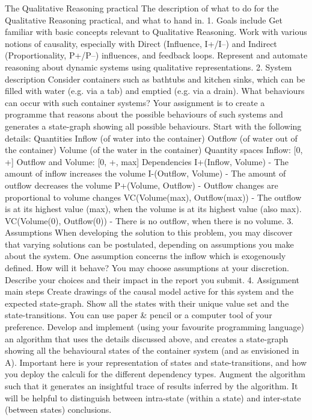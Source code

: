 The Qualitative Reasoning practical
The description of what to do for the Qualitative Reasoning practical, and what to hand in.
1. Goals include
Get familiar with basic concepts relevant to Qualitative Reasoning.
Work with various notions of causality, especially with Direct (Influence, I+/I–) and Indirect (Proportionality, P+/P–) influences, and feedback loops.
Represent and automate reasoning about dynamic systems using qualitative representations.
2. System description
Consider containers such as bathtubs and kitchen sinks, which can be filled with water (e.g. via a tab) and emptied (e.g. via a drain). What behaviours can occur with such container systems? Your assignment is to create a programme that reasons about the possible behaviours of such systems and generates a state-graph showing all possible behaviours.
Start with the following details:
Quantities
Inflow (of water into the container)
Outflow (of water out of the container)
Volume (of the water in the container)
Quantity spaces
Inflow: [0, +]
Outflow and Volume: [0, +, max]
Dependencies
I+(Inflow, Volume) - The amount of inflow increases the volume
I-(Outflow, Volume) - The amount of outflow decreases the volume
P+(Volume, Outflow) - Outflow changes are proportional to volume changes
VC(Volume(max), Outflow(max)) - The outflow is at its highest value (max), when the volume is at its highest value (also max).
VC(Volume(0), Outflow(0)) - There is no outflow, when there is no volume.
3. Assumptions
When developing the solution to this problem, you may discover that varying solutions can be postulated, depending on assumptions you make about the system. One assumption concerns the inflow which is exogenously defined. How will it behave? You may choose assumptions at your discretion. Describe your choices and their impact in the report you submit.
4. Assignment main steps
Create drawings of the causal model active for this system and the expected state-graph. Show all the states with their unique value set and the state-transitions. You can use paper & pencil or a computer tool of your preference.
Develop and implement (using your favourite programming language) an algorithm that uses the details discussed above, and creates a state-graph showing all the behavioural states of the container system (and as envisioned in A). Important here is your representation of states and state-transitions, and how you deploy the calculi for the different dependency types.
Augment the algorithm such that it generates an insightful trace of results inferred by the algorithm. It will be helpful to distinguish between intra-state (within a state) and inter-state (between states) conclusions.
